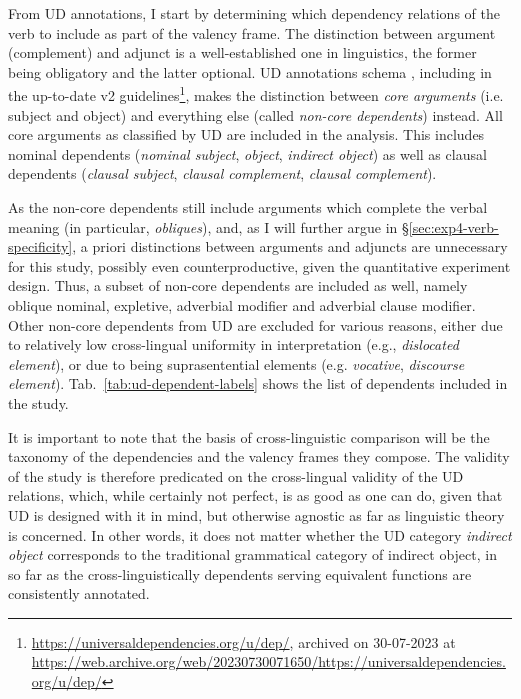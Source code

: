 From UD annotations, I start by determining which dependency relations of the verb to include as part of the valency frame. The distinction between argument (complement) and adjunct is a well-established one in linguistics, the former being obligatory and the latter optional. UD annotations schema \citep{demarneffe2014}, including in the up-to-date v2 guidelines\footnote{\url{https://universaldependencies.org/u/dep/}, archived on 30-07-2023 at \url{https://web.archive.org/web/20230730071650/https://universaldependencies.org/u/dep/}}, makes the distinction between \textit{core arguments} (i.e. subject and object) and everything else (called \textit{non-core dependents}) instead. All core arguments as classified by UD are included in the analysis. This includes nominal dependents (\textit{nominal subject}, \textit{object}, \textit{indirect object}) as well as clausal dependents (\textit{clausal subject}, \textit{clausal complement}, \textit{clausal complement}). 

As the non-core dependents still include arguments which complete the verbal meaning (in particular, \textit{obliques}), and, as I will further argue in §\ref{sec:exp4-verb-specificity}, a priori distinctions between arguments and adjuncts are unnecessary for this study, possibly even counterproductive, given the quantitative experiment design. Thus, a subset of non-core dependents are included as well, namely oblique nominal, expletive, adverbial modifier and adverbial clause modifier. Other non-core dependents from UD are excluded for various reasons, either due to relatively low cross-lingual uniformity in interpretation (e.g., \textit{dislocated element}), or due to being suprasentential elements (e.g. \textit{vocative}, \textit{discourse element}). Tab.~\ref{tab:ud-dependent-labels} shows the list of dependents included in the study.

It is important to note that the basis of cross-linguistic comparison will be the taxonomy of the dependencies and the valency frames they compose. The validity of the study is therefore predicated on the cross-lingual validity of the UD relations, which, while certainly not perfect, is as good as one can do, given that UD is designed with it in mind, but otherwise agnostic as far as linguistic theory is concerned. In other words, it does not matter whether the UD category \textit{indirect object} corresponds to the traditional grammatical category of indirect object, in so far as the cross-linguistically dependents serving equivalent functions are consistently annotated.

